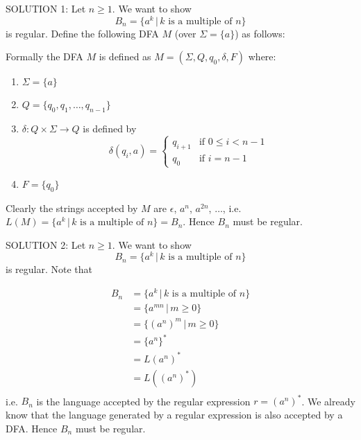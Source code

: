 
SOLUTION 1:
Let $n \geq 1$.
We want to show 
\[
B_n = \{a^k \,|\, k \text{ is a multiple of $n$} \}
\] 
is regular. 
Define the following DFA $M$ (over $\Sigma = \{a\}$) as follows:
\begin{center}
\end{center}
Formally the DFA $M$ is defined as
$M = (\Sigma, Q, q_0, \delta, F)$ where:
\begin{enumerate}[topsep=0in,parsep=0in]
\item $\Sigma = \{a\}$
\item $Q = \{q_0, q_1, \ldots, q_{n-1}\}$
\item $\delta : Q \times \Sigma \rightarrow Q$ is defined by 
 \[
 \delta(q_i, a)
 =
 \begin{cases}
 q_{i + 1} & \text{if } 0 \leq i < n - 1 \\
 q_0       & \text{if } i = n - 1
 \end{cases}
 \]
\item $F = \{q_0\}$
\end{enumerate}
Clearly the strings accepted by $M$ are $\epsilon$, $a^n$, $a^{2n}$, $\ldots$,
i.e. $L(M) = \{a^k \,|\, \text{$k$ is a multiple of $n$}\} = B_n$.
Hence $B_n$ must be regular.

SOLUTION 2:
Let $n \geq 1$.
We want to show 
\[
B_n = \{a^k \,|\, k \text{ is a multiple of $n$} \}
\] 
is regular. Note that 

\begin{align*}
B_n 
&= \{a^k \,|\, k \text{ is a multiple of $n$} \} \\
&= \{a^{mn} \,|\, m \geq 0 \} \\
&= \{(a^n)^m \,|\, m \geq 0 \} \\
&= \{a^n\}^* \\
&= L(a^n)^* \\
&= L((a^n)^*) \\
\end{align*}
i.e. $B_n$ is the language accepted by the regular expression $r = (a^n)^*$.
We already know that the language generated by a regular expression is also
accepted by a DFA.
Hence $B_n$ must be regular.

